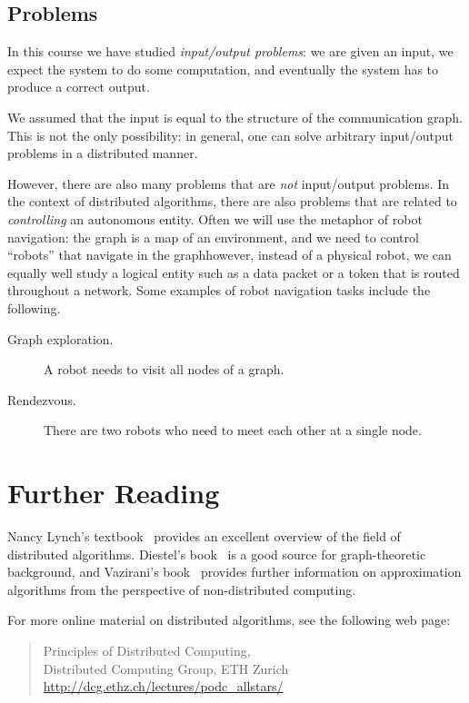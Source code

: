 \subsection{Problems}

In this course we have studied \emph{input/output problems}: we are given an input, we expect the system to do some computation, and eventually the system has to produce a correct output.

We assumed that the input is equal to the structure of the communication graph. This is not the only possibility: in general, one can solve arbitrary input/output problems in a distributed manner.

However, there are also many problems that are \emph{not} input/output problems. In the context of distributed algorithms, there are also problems that are related to \emph{controlling} an autonomous entity. Often we will use the metaphor of robot navigation: the graph is a map of an environment, and we need to control ``robots'' that navigate in the graph\mydash however, instead of a physical robot, we can equally well study a logical entity such as a data packet or a token that is routed throughout a network. Some examples of robot navigation tasks include the following.
\begin{description}
    \item[Graph exploration.] A robot needs to visit all nodes of a graph.
    \item[Rendezvous.] There are two robots who need to meet each other at a single node.
\end{description}


\section{Further Reading}

Nancy Lynch's textbook~\cite{lynch96book} provides an excellent overview of the field of distributed algorithms. Diestel's book~\cite{diestel05graph} is a good source for graph-theoretic background, and Vazirani's book~\cite{vazirani01approximation} provides further information on approximation algorithms from the perspective of non-distributed computing.

For more online material on distributed algorithms, see the following web page:
\begin{quote}
    Principles of Distributed Computing, \\
    Distributed Computing Group, ETH Zurich \\[1ex]
    \url{http://dcg.ethz.ch/lectures/podc_allstars/}
\end{quote}


